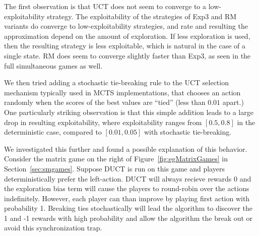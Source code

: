 The first observation is that UCT does not seem to converge to a low-exploitability strategy. The exploitability of the strategies of 
Exp3 and RM variants do converge to low-exploitability strategies, and rate and resulting the approximation depend on the amount of exploration. 
If less exploration is used, then the resulting strategy is less exploitable, which is natural in the case of a single state. RM does seem to 
converge slightly faster than Exp3, as seen in the full simultaneous games as well. 

We then tried adding a stochastic tie-breaking rule to the UCT selection mechanism typically used in MCTS implementations, that chooses an 
action randomly when the scores of the best values are ``tied'' (less than $0.01$ apart.)
One particularly striking observation is that this simple addition leads to a large drop in resulting exploitability, where exploitability
ranges from $[0.5,0.8]$ in the deterministic case, compared to $[0.01,0.05]$ with stochastic tie-breaking. 

We investigated this further and found a possible
explanation of this behavior. Consider the matrix game on the right of Figure~\ref{fig:egMatrixGames} in Section~\ref{sec:smgames}.
Suppose DUCT is run on this game and players deterministically prefer the left-action. 
DUCT will always recieve rewards 0 and the exploration bias term will cause the players to round-robin over the actions indefinitely. 
However, each player can than improve by playing first action with probability 1. Breaking ties stochastically will lead the algorithm to 
discover the 1 and -1 rewards with high probability and allow the algorithm the break out or avoid this synchronization trap.





